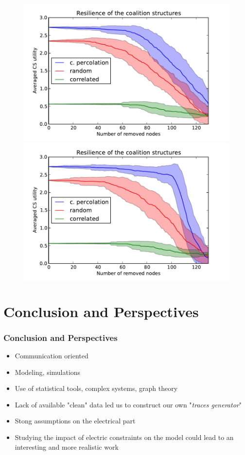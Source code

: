 \documentclass[xcolor=dvipsnames]{beamer}
\begin{document}
\begin{frame}
	\begin{figure}
		\includegraphics[scale=.35]{resilience_without}
		\includegraphics[scale=.35]{resilience_with.pdf}
	\end{figure}

\end{frame}



%
%
\section{Conclusion and Perspectives}
\begin{frame}
	\frametitle{Conclusion and Perspectives}

	\begin{itemize}
		\item Communication oriented
		\item Modeling, simulations
		\item Use of statistical tools, complex systems, graph theory
		\item Lack of available "clean" data led us to construct our own "\textit{traces generator}"
		\item Stong assumptions on the electrical part
		\item Studying the impact of electric constraints on the model could lead to an interesting and more realistic work
	\end{itemize}		
	
\end{frame}
\end{document}
